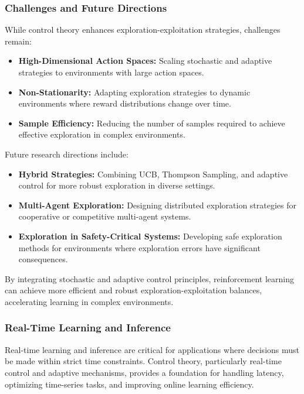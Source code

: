 \documentclass{IEEEojcsys}
\begin{document}
\subsubsection{Challenges and Future Directions}
While control theory enhances exploration-exploitation strategies, challenges remain:
\begin{itemize}
    \item \textbf{High-Dimensional Action Spaces:} Scaling stochastic and adaptive strategies to environments with large action spaces.
    \item \textbf{Non-Stationarity:} Adapting exploration strategies to dynamic environments where reward distributions change over time.
    \item \textbf{Sample Efficiency:} Reducing the number of samples required to achieve effective exploration in complex environments.
\end{itemize}

Future research directions include:
\begin{itemize}
    \item \textbf{Hybrid Strategies:} Combining UCB, Thompson Sampling, and adaptive control for more robust exploration in diverse settings.
    \item \textbf{Multi-Agent Exploration:} Designing distributed exploration strategies for cooperative or competitive multi-agent systems.
    \item \textbf{Exploration in Safety-Critical Systems:} Developing safe exploration methods for environments where exploration errors have significant consequences.
\end{itemize}

By integrating stochastic and adaptive control principles, reinforcement learning can achieve more efficient and robust exploration-exploitation balances, accelerating learning in complex environments.

\subsubsection{Real-Time Learning and Inference}
Real-time learning and inference are critical for applications where decisions must be made within strict time constraints. Control theory, particularly real-time control and adaptive mechanisms, provides a foundation for handling latency, optimizing time-series tasks, and improving online learning efficiency.
\end{document}
